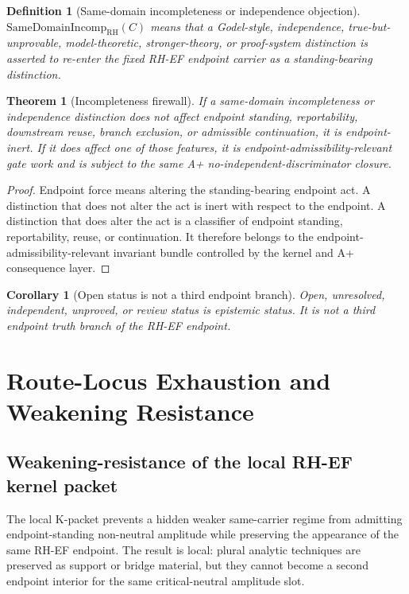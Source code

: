 \documentclass[11pt]{article}
\newtheorem{definition}{Definition}[section]
\newtheorem{theorem}{Theorem}[section]
\newtheorem{corollary}{Corollary}[section]
\newcommand{\RH}{\mathrm{RH}}
\newcommand{\SameDomIncomp}{\mathrm{SameDomainIncomp}}
\begin{document}
\begin{definition}[Same-domain incompleteness or independence objection]
\(\SameDomIncomp_{\RH}(C)\) means that a Godel-style, independence, true-but-unprovable, model-theoretic, stronger-theory, or proof-system distinction is asserted to re-enter the fixed RH-EF endpoint carrier as a standing-bearing distinction.
\end{definition}

\begin{theorem}[Incompleteness firewall]
If a same-domain incompleteness or independence distinction does not affect endpoint standing, reportability, downstream reuse, branch exclusion, or admissible continuation, it is endpoint-inert.  If it does affect one of those features, it is endpoint-admissibility-relevant gate work and is subject to the same A+ no-independent-discriminator closure.
\end{theorem}

\begin{proof}
Endpoint force means altering the standing-bearing endpoint act.  A distinction that does not alter the act is inert with respect to the endpoint.  A distinction that does alter the act is a classifier of endpoint standing, reportability, reuse, or continuation.  It therefore belongs to the endpoint-admissibility-relevant invariant bundle controlled by the kernel and A+ consequence layer.
\end{proof}

\begin{corollary}[Open status is not a third endpoint branch]
Open, unresolved, independent, unproved, or review status is epistemic status.  It is not a third endpoint truth branch of the RH-EF endpoint.
\end{corollary}


\section{Route-Locus Exhaustion and Weakening Resistance}

\subsection{Weakening-resistance of the local RH-EF kernel packet}

The local K-packet prevents a hidden weaker same-carrier regime from admitting endpoint-standing non-neutral amplitude while preserving the appearance of the same RH-EF endpoint.  The result is local: plural analytic techniques are preserved as support or bridge material, but they cannot become a second endpoint interior for the same critical-neutral amplitude slot.
\end{document}
